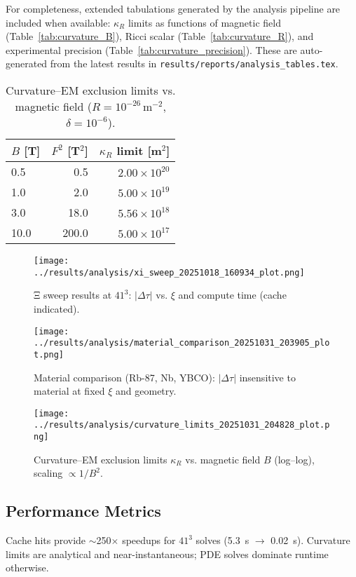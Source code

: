 \documentclass[10pt,twocolumn]{article}
\begin{document}
For completeness, extended tabulations generated by the analysis pipeline are included when available: $\kappa_R$ limits as functions of magnetic field (Table~\ref{tab:curvature_B}), Ricci scalar (Table~\ref{tab:curvature_R}), and experimental precision (Table~\ref{tab:curvature_precision}). These are auto-generated from the latest results in \texttt{results/reports/analysis\_tables.tex}.

\begin{table}[t]
  \centering
  \caption{Curvature--EM exclusion limits vs. magnetic field ($R=10^{-26}\,\mathrm{m^{-2}}$, $\delta=10^{-6}$).}
  \label{tab:kappaB}
  \begin{tabular}{@{}lrr@{}}
    \toprule
    $B$ [T] & $F^2$ [T$^2$] & $\kappa_R$ limit [m$^2$] \\
    \midrule
    0.5  &  0.5  & $2.00\times10^{20}$ \\
    1.0  &  2.0  & $5.00\times10^{19}$ \\
    3.0  & 18.0  & $5.56\times10^{18}$ \\
    10.0 & 200.0 & $5.00\times10^{17}$ \\
    \bottomrule
  \end{tabular}
\end{table}

\begin{figure*}[t]
  \centering
  \texttt{[image: ../results/analysis/xi\_sweep\_20251018\_160934\_plot.png]}
  \caption{Ξ sweep results at $41^3$: $|\Delta\tau|$ vs. $\xi$ and compute time (cache indicated).}
  \label{fig:xi_sweep}
\end{figure*}

\begin{figure}[h]
  \centering
  \texttt{[image: ../results/analysis/material\_comparison\_20251031\_203905\_plot.png]}
  \caption{Material comparison (Rb-87, Nb, YBCO): $|\Delta\tau|$ insensitive to material at fixed $\xi$ and geometry.}
  \label{fig:materials}
\end{figure}

\begin{figure}[h]
  \centering
  \texttt{[image: ../results/analysis/curvature\_limits\_20251031\_204828\_plot.png]}
  \caption{Curvature--EM exclusion limits $\kappa_R$ vs. magnetic field $B$ (log--log), scaling $\propto 1/B^2$.}
  \label{fig:kappa_vs_B}
\end{figure}

\subsection{Performance Metrics}
Cache hits provide $\sim$250$\times$ speedups for $41^3$ solves (5.3~s $\rightarrow$ 0.02~s). Curvature limits are analytical and near-instantaneous; PDE solves dominate runtime otherwise.
\end{document}

